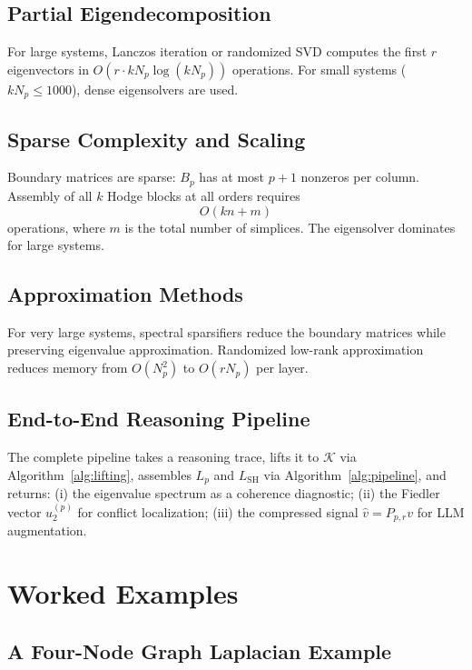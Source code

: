\documentclass[11pt]{article}
\theoremstyle{definition}
\theoremstyle{remark}
\newcommand{\LSH}{L_{\mathrm{SH}}}
\newcommand{\Pp}{P_{p,r}}
\newcommand{\vhat}{\hat{v}}
\newcommand{\calK}{\mathcal{K}}
\begin{document}
\subsection{Partial Eigendecomposition}

For large systems, Lanczos iteration or randomized SVD computes the first $r$
eigenvectors in $O(r\cdot kN_p\log(kN_p))$ operations. For small systems
($kN_p \leq 1000$), dense eigensolvers are used.

\subsection{Sparse Complexity and Scaling}

Boundary matrices are sparse: $B_p$ has at most $p+1$ nonzeros per column.
Assembly of all $k$ Hodge blocks at all orders requires
\[
  O(kn + m)
\]
operations, where $m$ is the total number of simplices. The eigensolver dominates
for large systems.

\subsection{Approximation Methods}

For very large systems, spectral sparsifiers reduce the boundary matrices while
preserving eigenvalue approximation. Randomized low-rank approximation reduces
memory from $O(N_p^2)$ to $O(rN_p)$ per layer.

\subsection{End-to-End Reasoning Pipeline}

The complete pipeline takes a reasoning trace, lifts it to $\calK$ via
Algorithm~\ref{alg:lifting}, assembles $L_p$ and $\LSH$ via
Algorithm~\ref{alg:pipeline}, and returns: (i) the eigenvalue spectrum as a
coherence diagnostic; (ii) the Fiedler vector $u_2^{(p)}$ for conflict
localization; (iii) the compressed signal $\vhat = \Pp v$ for LLM augmentation.


\section{Worked Examples}
\label{sec:examples}

\subsection{A Four-Node Graph Laplacian Example}
\end{document}
